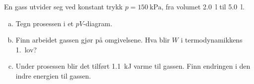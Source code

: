 %
En gass utvider seg ved konstant trykk $p = \SI{150}{\kilo\pascal}$, fra volumet \SI{2.0}{\litre} til \SI{5.0}{\litre}.
\begin{enumerate}[a)]
    \item Tegn prosessen i et $pV$-diagram.
    \item Finn arbeidet gassen gjør på omgivelsene. Hva blir $W$ i termodynamikkens 1.\ lov?
    \item Under prosessen blir det tilført \SI{1.1}{\kilo\joule} varme til gassen. Finn endringen i den indre energien til gassen.
\end{enumerate}
%
